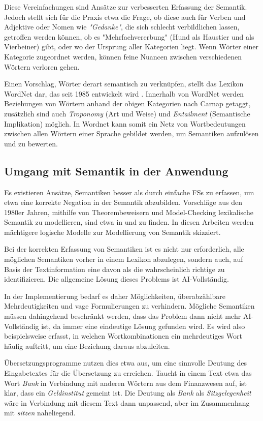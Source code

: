 \documentclass[12pt]{report}
\begin{document}
Diese Vereinfachungen sind Ansätze zur verbesserten Erfassung der Semantik.  Jedoch stellt sich für die Praxis etwa die Frage, ob diese auch für Verben und Adjektive oder Nomen wie \textit{"Gedanke"}, die sich schlecht verbildlichen lassen, getroffen werden können, ob es "Mehrfachvererbung" (Hund als Haustier und als Vierbeiner) gibt, oder wo der Ursprung aller Kategorien liegt. Wenn Wörter einer Kategorie zugeordnet werden, können feine Nuancen zwischen verschiedenen Wörtern verloren gehen. 

Einen Vorschlag, Wörter derart semantisch zu verknüpfen, stellt das Lexikon WordNet dar, das seit 1985 entwickelt wird \cite{mil95}. Innerhalb von WordNet werden Beziehungen von Wörtern anhand der obigen Kategorien nach Carnap getaggt, zusätzlich sind auch \textit{Troponomy} (Art und Weise) und \textit{Entailment} (Semantische Implikation) möglich. In Wordnet kann somit ein Netz von Wortbedeutungen zwischen allen Wörtern einer Sprache gebildet werden, um Semantiken aufzulösen und zu bewerten. 

\subsection{Umgang mit Semantik in der Anwendung}
Es existieren Ansätze, Semantiken besser als durch einfache FSs zu erfassen, um etwa eine korrekte Negation in der Semantik abzubilden. Vorschläge aus den 1980er Jahren, mithilfe von Theorembeweisern und Model-Checking lexikalische Semantik zu modellieren, sind etwa in \cite{sb88} und \cite{kn85} zu finden. In diesen Arbeiten werden mächtigere logische Modelle zur Modellierung von Semantik skizziert. 

Bei der korrekten Erfassung von Semantiken ist es nicht nur erforderlich, alle möglichen Semantiken vorher in einem Lexikon abzulegen, sondern auch, auf Basis der Textinformation eine davon als die wahrscheinlich richtige zu identifizieren. Die allgemeine Lösung dieses Problems ist AI-Vollständig. 

In der Implementierung bedarf es daher Möglichkeiten, überabzählbare Mehrdeutigkeiten und vage Formulierungen zu verhindern. Mögliche Semantiken müssen dahingehend beschränkt werden, dass das Problem dann nicht mehr AI-Vollständig ist, da immer eine eindeutige Lösung gefunden wird. Es wird also beispielsweise erfasst, in welchen Wortkombinationen ein mehrdeutiges Wort häufig auftritt, um eine Beziehung daraus abzuleiten. 

Übersetzungsprogramme nutzen dies etwa aus, um eine sinnvolle Deutung des Eingabetextes für die Übersetzung zu erreichen. Taucht in einem Text etwa das Wort \textit{Bank} in Verbindung mit anderen Wörtern aus dem Finanzwesen auf, ist klar, dass ein \textit{Geldinstitut} gemeint ist. Die Deutung als \textit{Bank} als \textit{Sitzgelegenheit} wäre in Verbindung mit diesem Text dann unpassend, aber im Zusammenhang mit \textit{sitzen} naheliegend. 
\end{document}
